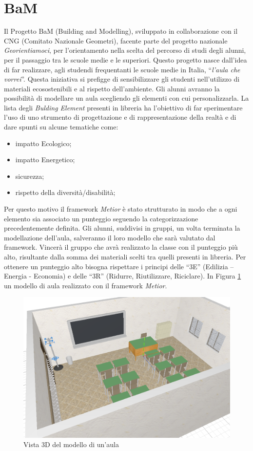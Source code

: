 \section{BaM}
\label{sec:chapter_4_section_1}
Il Progetto BaM (Building and Modelling), sviluppato in collaborazione con il CNG (Comitato Nazionale Geometri),
facente parte del progetto nazionale \emph{Georientiamoci}, per l’orientamento nella scelta
del percorso di studi degli alunni, per il passaggio tra le scuole medie e le superiori.
Questo progetto nasce dall'idea di far realizzare, agli studendi frequentanti le scuole medie in Italia,
``\emph{l'aula che vorrei}''. Questa iniziativa si prefigge di sensibilizzare gli studenti nell’utilizzo di materiali
ecosostenibili e al rispetto dell’ambiente.
Gli alunni avranno la possibilità di modellare un aula scegliendo gli elementi con cui personalizzarla.
La lista degli \emph{Bulding Element} presenti in libreria ha l’obiettivo di far sperimentare l’uso di uno strumento di progettazione
e di rappresentazione della realtà e di dare spunti su alcune tematiche come:
\begin{itemize}
\item impatto Ecologico;
\item impatto Energetico;
\item sicurezza;
\item rispetto della diversità/disabilità;
\end{itemize}
Per questo motivo il framework \emph{Metior} è stato strutturato in modo che a ogni elemento sia associato un punteggio seguendo
la categorizzazione precedentemente definita.
Gli alunni, suddivisi in gruppi, un volta terminata la modellazione dell'aula, salveranno il loro modello che sarà valutato
dal framework.
Vincerà il gruppo che avrà realizzato la classe con il punteggio più alto, risultante dalla somma dei materiali scelti
tra quelli presenti in libreria. Per ottenere un punteggio alto bisogna rispettare i principi delle
“3E” (Edilizia – Energia - Economia) e delle “3R” (Ridurre, Riutilizzare, Riciclare). In Figura \ref{fig:3daula}
un modello di aula realizzato con il framework \emph{Metior}.\\
\begin{figure}[htbp] %
   \centering
   \includegraphics[width=0.75\linewidth]{images/3d-school-2}
   \caption{Vista 3D del modello di un'aula}
   \label{fig:3daula}
   \end{figure}
\newpage

